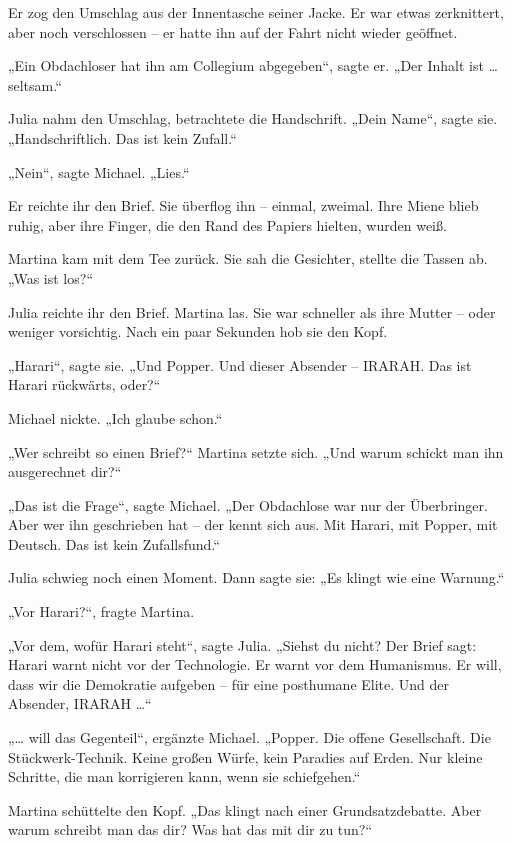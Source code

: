 \documentclass[
]{article}
\begin{document}
Er zog den Umschlag aus der Innentasche seiner Jacke. Er war etwas zerknittert, aber noch verschlossen -- er hatte ihn auf der Fahrt nicht wieder geöffnet.

„Ein Obdachloser hat ihn am Collegium abgegeben``, sagte er. „Der Inhalt ist \ldots{} seltsam.``

Julia nahm den Umschlag, betrachtete die Handschrift. „Dein Name``, sagte sie. „Handschriftlich. Das ist kein Zufall.``

„Nein``, sagte Michael. „Lies.``

Er reichte ihr den Brief. Sie überflog ihn -- einmal, zweimal. Ihre Miene blieb ruhig, aber ihre Finger, die den Rand des Papiers hielten, wurden weiß.

Martina kam mit dem Tee zurück. Sie sah die Gesichter, stellte die Tassen ab. „Was ist los?{\kern0pt}``

Julia reichte ihr den Brief. Martina las. Sie war schneller als ihre Mutter -- oder weniger vorsichtig. Nach ein paar Sekunden hob sie den Kopf.

„Harari``, sagte sie. „Und Popper. Und dieser Absender -- IRARAH. Das ist Harari rückwärts, oder?{\kern0pt}``

Michael nickte. „Ich glaube schon.``

„Wer schreibt so einen Brief?{\kern0pt}`` Martina setzte sich. „Und warum schickt man ihn ausgerechnet dir?{\kern0pt}``

„Das ist die Frage``, sagte Michael. „Der Obdachlose war nur der Überbringer. Aber wer ihn geschrieben hat -- der kennt sich aus. Mit Harari, mit Popper, mit Deutsch. Das ist kein Zufallsfund.``

Julia schwieg noch einen Moment. Dann sagte sie: „Es klingt wie eine Warnung.``

„Vor Harari?{\kern0pt}``, fragte Martina.

„Vor dem, wofür Harari steht``, sagte Julia. „Siehst du nicht? Der Brief sagt: Harari warnt nicht vor der Technologie. Er warnt vor dem Humanismus. Er will, dass wir die Demokratie aufgeben -- für eine posthumane Elite. Und der Absender, IRARAH \ldots``

„\ldots{} will das Gegenteil``, ergänzte Michael. „Popper. Die offene Gesellschaft. Die Stückwerk-Technik. Keine großen Würfe, kein Paradies auf Erden. Nur kleine Schritte, die man korrigieren kann, wenn sie schiefgehen.``

Martina schüttelte den Kopf. „Das klingt nach einer Grundsatzdebatte. Aber warum schreibt man das dir? Was hat das mit dir zu tun?{\kern0pt}``
\end{document}
